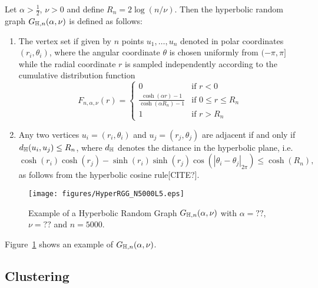 Let $\alpha > \frac{1}{2}$, $\nu > 0$ and define $R_n = 2\log(n/\nu)$. Then the hyperbolic random graph $G_{\mathbb{H},n}(\alpha, \nu)$ is defined as follows:
\begin{enumerate}
\item The vertex set if given by $n$ points $u_1, \dots, u_n$ denoted in polar coordinates $(r_i, \theta_i)$, where the angular coordinate $\theta$ is chosen uniformly from $(-\pi,\pi]$ while the radial coordinate $r$ is sampled independently according to the cumulative distribution function
\begin{equation}\label{eq:def_hyperbolic_point_distribution}
	F_{n,\alpha,\nu}(r) = \begin{cases}
		0 &\mbox{if } r < 0\\
		\frac{\cosh(\alpha r)-1}{\cosh(\alpha R_n) - 1} &\mbox{if } 0 \le r \le R_n\\
		1&\mbox{if } r > R_n
	\end{cases}
\end{equation}
\item Any two vertices $u_i=(r_i,\theta_i)$ and $u_j=(r_j,\theta_j)$ are adjacent if and only if $d_{\mathbb{H}}(u_i,u_j) \le R_n$, where $d_{\mathbb{H}}$ denotes the distance in the hyperbolic plane, i.e.
\[
	\cosh(r_i) \cosh(r_j) - \sinh(r_i) \sinh( r_j) \cos(|\theta_i-\theta_j|_{2\pi}) \le \cosh(R_n),
\]
as follows from the hyperbolic cosine rule[CITE?].
\end{enumerate}

\begin{figure}[!t]
\centering
\texttt{[image: figures/HyperRGG\_N5000L5.eps]}
\caption{Example of a Hyperbolic Random Graph $G_{\mathbb{H},n}(\alpha, \nu)$ with $\alpha = ??$, $\nu = ??$ and $n = 5000$.
}
\label{fig:H_graph_example}
\end{figure}



Figure~\ref{fig:H_graph_example} shows an example of $G_{\mathbb{H},n}(\alpha, \nu)$.






\subsection{Clustering}\label{ssec:local_clustering}

